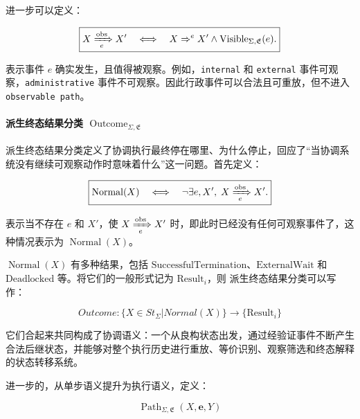 进一步可以定义：

\begin{equation}
  \boxed{
    X\xRightarrow[e]{\mathrm{obs}}X'
    \quad\Longleftrightarrow\quad
    X\Rightarrow^{e}X'
    \land
    \operatorname{Visible}_{\Sigma,\mathfrak E}(e).
  }\label{eq:observable-coordination-step}
\end{equation}

表示事件 $e$ 确实发生，且值得被观察。例如，\texttt{internal} 和 \texttt{external} 事件可观察，\texttt{administrative} 事件不可观察。因此行政事件可以合法且可重放，但不进入 \texttt{observable path}。

\paragraph{派生终态结果分类 $\operatorname{Outcome}_{\Sigma,\mathfrak E}$} 派生终态结果分类定义了协调执行最终停在哪里、为什么停止，回应了“当协调系统没有继续可观察动作时意味着什么”这一问题。首先定义：

\begin{equation}
  \boxed{
    \operatorname{Normal}(X)
    \quad\Longleftrightarrow\quad
    \neg\exists e,X',
    \;
    X\xRightarrow[e]{\mathrm{obs}}X'.
  }\label{eq:normal-coordination-state}
\end{equation}

表示当不存在 $e$ 和 $X'$，使 $X\xRightarrow[e]{\mathrm{obs}}X'$ 时，即此时已经没有任何可观察事件了，这种情况表示为 $\operatorname{Normal}(X)$。

$\operatorname{Normal}(X)$ 有多种结果，包括 $\text{SuccessfulTermination}$、$\text{ExternalWait}$ 和 $\text{Deadlocked}$ 等。将它们的一般形式记为 $\text{Result}_{i}$，则 派生终态结果分类可以写作：

\begin{equation}
  \boxed{
    Outcome:
    \{X\in St_\Sigma|Normal(X)\} \rightarrow \{\text{Result}_{i}\}
  }\label{eq:terminal-outcome-classification}
\end{equation}

它们合起来共同构成了协调语义：一个从良构状态出发，通过经验证事件不断产生合法后继状态，并能够对整个执行历史进行重放、等价识别、观察筛选和终态解释的状态转移系统。

进一步的，从单步语义提升为执行语义，定义：

\begin{equation}
  \boxed{
    \operatorname{Path}_{\Sigma,\mathfrak E}
    \left(
      X,\mathbf e,Y
    \right)
  }\label{eq:coordination-path-predicate}
\end{equation}

